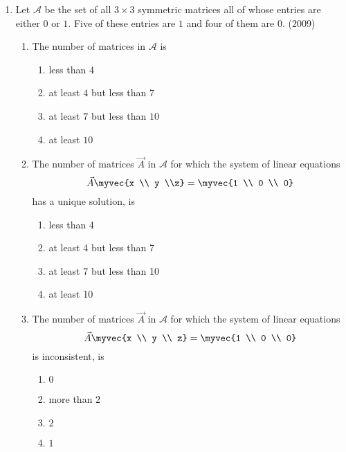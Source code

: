 \begin{enumerate}[label=\thesubsection.\arabic*.,ref=\thesubsection.\theenumi]
	\item Let $\mathcal{A}$ be the set of all $3\times3$ symmetric matrices all of whose entries are either $0$ or $1$. Five of these entries are $1$ and four of them are $0$.
			\hfill(2009)
%
	\begin{enumerate}
		\item The number of matrices in $\mathcal{A}$ is
\begin{multicols}{2}
			\begin{enumerate}
				\item less than $4$
				\item at least $4$ but less than $7$
				\item at least $7$ but less than $10$
				\item at least $10$
			\end{enumerate}
\end{multicols}
%		
		\item The number of matrices $\vec{A}$ in $\mathcal{A}$ for which the system of linear equations
			$$\vec{A}\myvec{x \\ y \\z}=\myvec{1 \\ 0 \\ 0}$$
			has a unique solution, is
%
			\begin{enumerate}
				\item less than 4
				\item at least 4 but less than 7
				\item at least 7 but less than 10
				\item at least 10
			\end{enumerate}
%
		\item The number of matrices $\vec{A}$ in $\mathcal{A}$ for which the system of linear equations
			$$\vec{A}\myvec{x \\ y \\ z}=\myvec{1 \\ 0 \\ 0}$$
			is inconsistent, is
\begin{multicols}{2}
			\begin{enumerate}
				\item $0$
				\item more than $2$
				\item $2$
				\item $1$
			\end{enumerate}
\end{multicols}
	\end{enumerate}


\end{enumerate}
